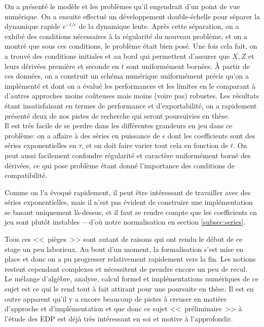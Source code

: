 
On a présenté le modèle et les problèmes qu'il engendrait d'un point de vue numérique. 
On a ensuite effectué un développement double-échelle pour séparer la dynamique rapide $e^{-t/\epsilon}$ de la dynamique lente. 
Après cette séparation, on a exhibé des conditions nécessaires à la régularité du nouveau problème, et on a montré que sous ces conditions, le problème était bien posé. 
Une fois cela fait, on a trouvé des conditions initiales et au bord qui permettent d'assurer que $X,Z$ et leurs dérivées première et seconde en $t$ sont uniformément bornées. 
À partir de ces données, on a construit un schéma numérique uniformément précis qu'on a implémenté et dont on a évalué les performances et les limites en le comparant à d'autres approches moins coûteuses mais moins (voire pas) robustes. 
Les résultats étant insatisfaisant en termes de performance et d'exportabilité, on a rapidement présenté deux de nos pistes de recherche qui seront poursuivies en thèse. \\


Il est très facile de se perdre dans les différentes grandeurs en jeu dans ce problème: on a affaire à des séries en puissance de $\epsilon$ dont les coefficients sont des séries exponentielles en $\tau$, et on doit faire varier tout cela en fonction de $t$. 
On peut aussi facilement confondre régularité et caractère uniformément borné des dérivées, ce qui pose problème étant donné l'importance des conditions de compatibilité. 

Comme on l'a évoqué rapidement, il peut être intéressant de travailler avec des séries exponentielles, mais il n'est pas évident de construire une implémentation se basant uniquement là-dessus, et il faut se rendre compte que les coefficients en jeu sont plutôt instables ---d'où notre normalisation en section \ref{subsec:series}. 

Tous ces <<~pièges~>> sont autant de raisons qui ont rendu le début de ce stage un peu laborieux. 
Au bout d'un moment, la formalisation s'est mise en place et donc on a pu progresser relativement rapidement vers la fin. Les notions restent cependant complexes et nécessitent de prendre encore un peu de recul. \\


Le mélange d'algèbre, analyse, calcul formel et implémentations numériques de ce sujet est ce qui le rend tout à fait attirant pour une poursuite en thèse. 
Il est en outre apparent qu'il y a encore beaucoup de pistes à creuser en matière d'approche et d'implémentation et que donc ce sujet <<~préliminaire~>> à l'étude des EDP est déjà très intéressant en soi et motive à l'approfondir. 